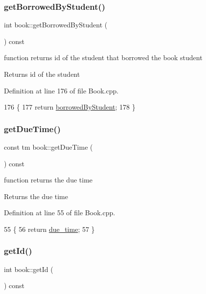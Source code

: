 \subsubsection{\texorpdfstring{get\+Borrowed\+By\+Student()}{getBorrowedByStudent()}}
{\footnotesize\ttfamily int book\+::get\+Borrowed\+By\+Student (\begin{DoxyParamCaption}{ }\end{DoxyParamCaption}) const}

function returns id of the student that borrowed the book student \begin{DoxyReturn}{Returns}
id of the student 
\end{DoxyReturn}


Definition at line 176 of file Book.\+cpp.


\begin{DoxyCode}
176                                      \{
177     \textcolor{keywordflow}{return} \hyperlink{classbook_afa5350900be6a34d8301a57d6db54df5}{borrowedByStudent};
178 \}
\end{DoxyCode}
\mbox{\label{classbook_aa8eda0350d5882656cf53321d559c277}} 
\subsubsection{\texorpdfstring{get\+Due\+Time()}{getDueTime()}}
{\footnotesize\ttfamily const tm book\+::get\+Due\+Time (\begin{DoxyParamCaption}{ }\end{DoxyParamCaption}) const}

function returns the due time \begin{DoxyReturn}{Returns}
the due time 
\end{DoxyReturn}


Definition at line 55 of file Book.\+cpp.


\begin{DoxyCode}
55                                 \{
56     \textcolor{keywordflow}{return} \hyperlink{classbook_abf72d9a32cdadee632df5a626dbe33b8}{due\_time};
57 \}
\end{DoxyCode}
\mbox{\label{classbook_ab0c28db5fce5e04944c8ead875ce0e6a}} 
\subsubsection{\texorpdfstring{get\+Id()}{getId()}}
{\footnotesize\ttfamily int book\+::get\+Id (\begin{DoxyParamCaption}{ }\end{DoxyParamCaption}) const}


